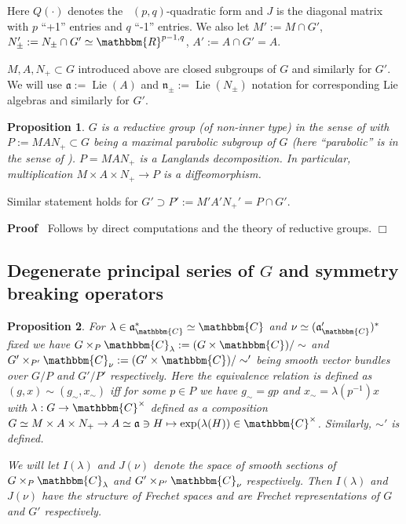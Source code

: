 \documentclass{article}
\newcommand{\assign}{:=}
\newcommand{\tmop}[1]{\ensuremath{\operatorname{#1}}}
\newenvironment{proof}{\noindent\textbf{Proof\ }}{\hspace*{\fill}$\Box$\medskip}
\numberwithin{definition}{section}
\numberwithin{lemma}{section}
\newtheorem{proposition}{Proposition}
\numberwithin{proposition}{section}
{\theorembodyfont{\rmfamily}\newtheorem{remark}{Remark}
\numberwithin{remark}{section}
}
\begin{document}
Here $Q ( \cdot)$ denotes the \ $( p, q)$-quadratic form and $J$ is the
diagonal matrix with $p$ ``+1'' entries and $q$ ``-1'' entries. We also let
$M' \assign M \cap G'$, $N_{\pm}' \assign N_{\pm} \cap G' \simeq
\mathbbm{R}^{p - 1, q}$, $A' \assign A \cap G' = A$.

\begin{remark}
  $M, A, N_+ \subset G$ introduced above are closed subgroups of $G$ and
  similarly for $G'$. We will use $\mathfrak{a} \assign \tmop{Lie} ( A)$ and
  $\mathfrak{n}_{\pm} \assign \tmop{Lie} ( N_{\pm})$ notation for
  corresponding Lie algebras and similarly for $G'$.
\end{remark}

\begin{proposition}
  $G$ is a reductive group (of non-inner type) in the sense of
  {\cite{wallach1988real}} with $P \assign M A N_+ \subset G$ being a maximal
  parabolic subgroup of $G$ (here ``parabolic'' is in the sense of {\cite[sec.
  2.2]{wallach1988real}}). $P = M A N_+$ is a Langlands decomposition. In
  particular, multiplication $M \times A \times N_+ \rightarrow P$ is a
  diffeomorphism.
\end{proposition}

\begin{remark}
  Similar statement holds for $G' \supset P' \assign M' A' N_+' = P \cap G'$.
\end{remark}

\begin{proof}
  Follows by direct computations and the theory of reductive groups.
\end{proof}

\subsection{Degenerate principal series of $G$ and symmetry breaking
operators}

\begin{proposition}
  \label{def-n-nots:prop-degseries}For $\lambda \in
  \mathfrak{a}_{\mathbbm{C}}^{\ast} \simeq \mathbbm{C}$ and $\nu \simeq (
  \mathfrak{a}_{\mathbbm{C}}')^{\ast}$ fixed we have $G \times_P
  \mathbbm{C}_{\lambda} \assign ( G \times \mathbbm{C}) / \sim$ and $G'
  \times_{P'} \mathbbm{C}_{\nu} \assign ( G' \times \mathbbm{C}) / \sim'$
  being smooth vector bundles over $G / P$ and $G' / P'$ respectively. Here
  the equivalence relation is defined as $( g, x) \sim ( g_{\sim}, x_{\sim})$
  iff for some $p \in P$ we have $g_{\sim} = g p$ and $x_{\sim} = \lambda (
  p^{- 1}) x$ with $\lambda : G \rightarrow \mathbbm{C}^{\times}$ defined as a
  composition $G \simeq M \times A \times N_+ \rightarrow A \simeq
  \mathfrak{a} \ni H \mapsto \exp ( \lambda ( H)) \in \mathbbm{C}^{\times}$.
  Similarly, $\sim'$ is defined.
  
  We will let $I ( \lambda)$ and $J ( \nu)$ denote the space of smooth
  sections of $G \times_P \mathbbm{C}_{\lambda}$ and $G' \times_{P'}
  \mathbbm{C}_{\nu}$ respectively. Then $I ( \lambda)$ and $J ( \nu)$ have the
  structure of Frechet spaces and are Frechet representations of $G$ and $G'$
  respectively.
\end{proposition}
\end{document}
